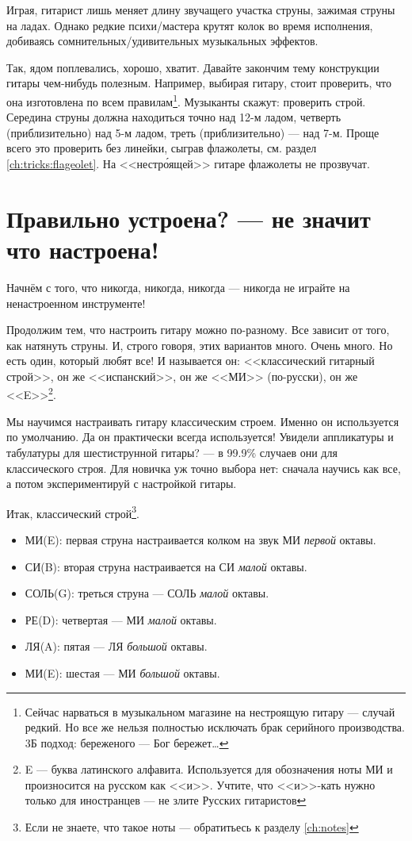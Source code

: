 Играя, гитарист лишь меняет длину звучащего участка струны, зажимая струны на ладах. Однако редкие психи/мастера крутят колок во время исполнения, добиваясь сомнительных/удивительных музыкальных эффектов.

Так, ядом поплевались, хорошо, хватит. Давайте закончим тему конструкции гитары чем-нибудь полезным. Например, выбирая гитару, стоит проверить, что она изготовлена по всем правилам\footnote{Сейчас нарваться в музыкальном магазине на нестроящую гитару --- случай редкий. Но все же нельзя полностью исключать брак серийного производства. 3Б подход: береженого --- Бог бережет\ldots}. Музыканты скажут: проверить строй. Середина струны должна находиться точно над 12-м ладом, четверть (приблизительно) над 5-м ладом, треть (приблизительно) --- над 7-м. Проще всего это проверить без линейки, сыграв флажолеты, см. раздел \ref{ch:tricks:flageolet}. На <<нестр\'{о}ящей>> гитаре флажолеты не прозвучат.


\section{Правильно устроена? --- не значит что настроена!}
\label{ch:guitar:tuning}

Начнём с того, что никогда, никогда, никогда --- никогда не играйте на ненастроенном инструменте!

Продолжим тем, что настроить гитару можно по-разному. Все зависит от того, как натянуть струны. И, строго говоря, этих вариантов много. Очень много. Но есть один, который любят все! И называется он: <<классический гитарный строй>>, он же <<испанский>>, он же <<МИ>> (по-русски), он же <<E>>\footnote{E --- буква латинского алфавита. Используется для обозначения ноты МИ и произносится на русском как <<и>>. Учтите, что <<и>>-кать нужно только для иностранцев --- не злите Русских гитаристов}. 

Мы научимся настраивать гитару классическим строем. Именно он используется по умолчанию. Да он практически всегда используется! Увидели аппликатуры и табулатуры для шестиструнной гитары? --- в 99.9\% случаев они для классического строя. Для новичка уж точно выбора нет: сначала научись как все, а потом экспериментируй с настройкой гитары.

Итак, классический строй\footnote{Если не знаете, что такое ноты --- обратитьесь к разделу \ref{ch:notes}}.
\begin{itemize}
    \item МИ(E): первая струна настраивается колком на звук МИ \emph{первой} октавы.
    \item СИ(B): вторая струна настраивается на СИ \emph{малой} октавы.
    \item СОЛЬ(G): треться струна --- СОЛЬ \emph{малой} октавы.
    \item РЕ(D): четвертая --- МИ \emph{малой} октавы.
    \item ЛЯ(A): пятая --- ЛЯ \emph{большой} октавы.
    \item МИ(E): шестая --- МИ \emph{большой} октавы.
\end{itemize}

